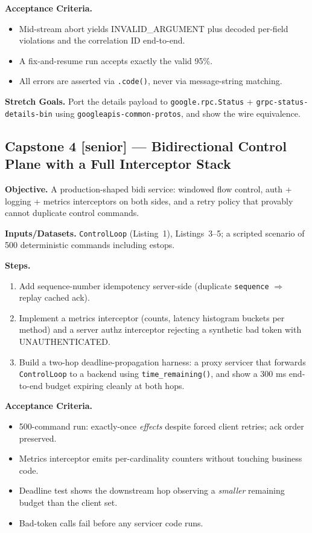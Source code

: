 \textbf{Acceptance Criteria.}
\begin{itemize}
  \item[$\square$] Mid-stream abort yields INVALID\_ARGUMENT plus decoded
        per-field violations and the correlation ID end-to-end.
  \item[$\square$] A fix-and-resume run accepts exactly the valid 95\%.
  \item[$\square$] All errors are asserted via \texttt{.code()}, never via
        message-string matching.
\end{itemize}

\textbf{Stretch Goals.} Port the details payload to
\texttt{google.rpc.Status} + \texttt{grpc-status-details-bin} using
\texttt{googleapis-common-protos}, and show the wire equivalence.

\subsection{Capstone 4 [senior] --- Bidirectional Control Plane with a Full
Interceptor Stack}

\textbf{Objective.} A production-shaped bidi service: windowed flow control,
auth + logging + metrics interceptors on both sides, and a retry policy that
provably cannot duplicate control commands.

\textbf{Inputs/Datasets.} \texttt{ControlLoop} (Listing~1), Listings~3--5; a
scripted scenario of 500 deterministic commands including estops.

\textbf{Steps.}
\begin{enumerate}
  \item Add sequence-number idempotency server-side (duplicate
        \texttt{sequence} $\Rightarrow$ replay cached ack).
  \item Implement a metrics interceptor (counts, latency histogram buckets per
        method) and a server authz interceptor rejecting a synthetic bad token
        with UNAUTHENTICATED.
  \item Build a two-hop deadline-propagation harness: a proxy servicer that
        forwards \texttt{ControlLoop} to a backend using
        \texttt{time\_remaining()}, and show a 300 ms end-to-end budget
        expiring cleanly at both hops.
\end{enumerate}

\textbf{Acceptance Criteria.}
\begin{itemize}
  \item[$\square$] 500-command run: exactly-once \emph{effects} despite forced
        client retries; ack order preserved.
  \item[$\square$] Metrics interceptor emits per-cardinality counters without
        touching business code.
  \item[$\square$] Deadline test shows the downstream hop observing a
        \emph{smaller} remaining budget than the client set.
  \item[$\square$] Bad-token calls fail before any servicer code runs.
\end{itemize}


